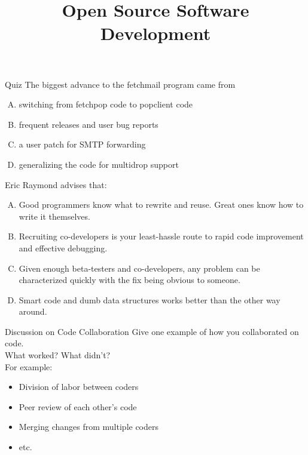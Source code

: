 \documentclass{beamer}
\title{Open Source Software Development}
\date{}
\begin{document}
\begin{frame}
\titlepage
\end{frame}

\begin{frame}{Quiz}
The biggest advance to the fetchmail program came from
\begin{enumerate}[(A)]
\item<1> switching from fetchpop code to popclient code
\item<1> frequent releases and user bug reports
\item<1-2> a user patch for SMTP forwarding
\item<1> generalizing the code for multidrop support
\end{enumerate}
\medskip
Eric Raymond advises that:
\begin{enumerate}[(A)]
\item<1> Good programmers know what to rewrite and reuse. Great ones know how to write it themselves.
\item<1> Recruiting co-developers is your least-hassle route to rapid code improvement and effective debugging.
\item<1-2> Given enough beta-testers and co-developers, any problem can be characterized quickly with the fix being obvious to someone.
\item<1>  Smart code and dumb data structures works better than the other way around.
\end{enumerate}
\end{frame}

\begin{frame}{Discussion on Code Collaboration}
Give one example of how you collaborated on code.\\
\bigskip
\bigskip
What worked? What didn't?\\
\bigskip
\bigskip
\pause
For example:
\begin{itemize}
\item Division of labor between coders
\item Peer review of each other's code
\item Merging changes from multiple coders
\item etc.
\end{itemize}
\end{frame}
\end{document}
